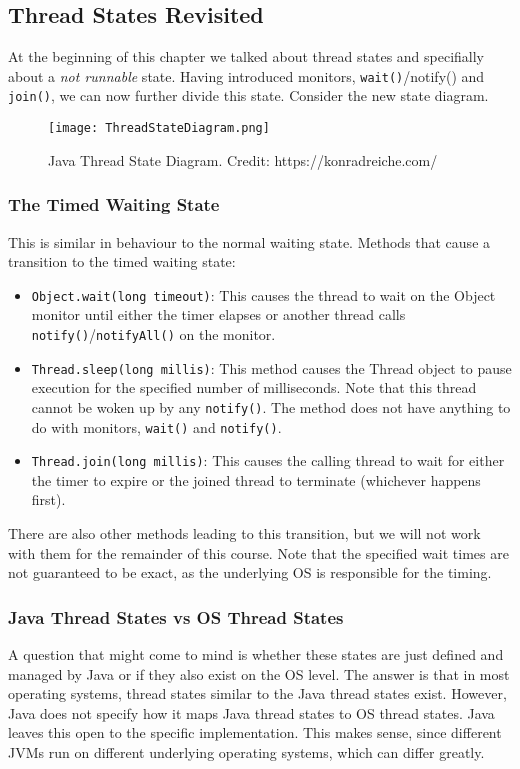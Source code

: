 \documentclass[main.tex]{subfiles}
\begin{document}
\subsection{Thread States Revisited}
At the beginning of this chapter we talked about thread states and specifially about a \textit{not runnable} state. Having introduced monitors, \texttt{wait()}/notify() and \texttt{join()}, we can now further divide this state. Consider the new state diagram.
\begin{figure}[H]
    \centering
    \texttt{[image: ThreadStateDiagram.png]}
    \caption{Java Thread State Diagram. Credit: https://konradreiche.com/}
\end{figure}
\subsubsection{The Timed Waiting State}
This is similar in behaviour to the normal waiting state. Methods that cause a transition to the timed waiting state:
\begin{itemize}
    \item \texttt{Object.wait(long timeout)}: This causes the thread to wait on the Object monitor until either the timer elapses or another thread calls \texttt{notify()}/\texttt{notifyAll()} on the monitor.
    \item \texttt{Thread.sleep(long millis)}: This method causes the Thread object to pause execution for the specified number of milliseconds. Note that this thread cannot be woken up by any \texttt{notify()}. The method does not have anything to do with monitors, \texttt{wait()} and \texttt{notify()}.
    \item \texttt{Thread.join(long millis)}: This causes the calling thread to wait for either the timer to expire or the joined thread to terminate (whichever happens first).
\end{itemize}
There are also other methods leading to this transition, but we will not work with them for the remainder of this course. Note that the specified wait times are not guaranteed to be exact, as the underlying OS is responsible for the timing.
\subsubsection{Java Thread States vs OS Thread States}
A question that might come to mind is whether these states are just defined and managed by Java or if they also exist on the OS level. The answer is that in most operating systems, thread states similar to the Java thread states exist. However, Java does not specify how it maps Java thread states to OS thread states. Java leaves this open to the specific implementation. This makes sense, since different JVMs run on different underlying operating systems, which can differ greatly.
\end{document}
